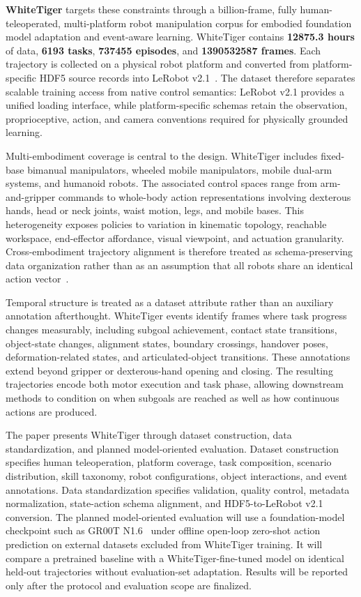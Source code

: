 \textbf{WhiteTiger} targets these constraints through a billion-frame, fully human-teleoperated, multi-platform robot manipulation corpus for embodied foundation model adaptation and event-aware learning. WhiteTiger contains \textbf{12875.3 hours} of data, \textbf{6193 tasks}, \textbf{737455 episodes}, and \textbf{1390532587 frames}. Each trajectory is collected on a physical robot platform and converted from platform-specific HDF5 source records into LeRobot v2.1~\cite{cadene2026lerobot}. The dataset therefore separates scalable training access from native control semantics: LeRobot v2.1 provides a unified loading interface, while platform-specific schemas retain the observation, proprioceptive, action, and camera conventions required for physically grounded learning.

Multi-embodiment coverage is central to the design. WhiteTiger includes fixed-base bimanual manipulators, wheeled mobile manipulators, mobile dual-arm systems, and humanoid robots. The associated control spaces range from arm-and-gripper commands to whole-body action representations involving dexterous hands, head or neck joints, waist motion, legs, and mobile bases. This heterogeneity exposes policies to variation in kinematic topology, reachable workspace, end-effector affordance, visual viewpoint, and actuation granularity. Cross-embodiment trajectory alignment is therefore treated as schema-preserving data organization rather than as an assumption that all robots share an identical action vector~\cite{bousmalis2023robocat,ghosh2024octo,xu2023xskill,liu2024rdt1b}.

Temporal structure is treated as a dataset attribute rather than an auxiliary annotation afterthought. WhiteTiger events identify frames where task progress changes measurably, including subgoal achievement, contact state transitions, object-state changes, alignment states, boundary crossings, handover poses, deformation-related states, and articulated-object transitions. These annotations extend beyond gripper or dexterous-hand opening and closing. The resulting trajectories encode both motor execution and task phase, allowing downstream methods to condition on when subgoals are reached as well as how continuous actions are produced.

The paper presents WhiteTiger through dataset construction, data standardization, and planned model-oriented evaluation. Dataset construction specifies human teleoperation, platform coverage, task composition, scenario distribution, skill taxonomy, robot configurations, object interactions, and event annotations. Data standardization specifies validation, quality control, metadata normalization, state-action schema alignment, and HDF5-to-LeRobot v2.1 conversion. The planned model-oriented evaluation will use a foundation-model checkpoint such as GR00T N1.6~\cite{nvidia2025grootn1} under offline open-loop zero-shot action prediction on external datasets excluded from WhiteTiger training. It will compare a pretrained baseline with a WhiteTiger-fine-tuned model on identical held-out trajectories without evaluation-set adaptation. Results will be reported only after the protocol and evaluation scope are finalized.

